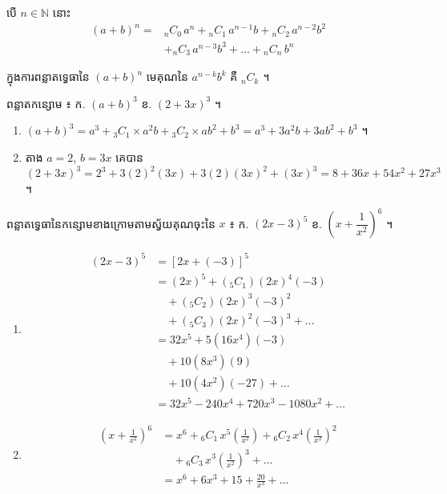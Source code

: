 \begin{theorem}[ទ្រឹស្ដីបទទ្វេធា]
បើ $n \in \mathbb{N}$ នោះ
\[ \begin{aligned} (a + b)^n = {}&{}_nC_0\, a^n + {}_nC_1\, a^{n-1}b + {}_nC_2\, a^{n-2}b^2\\ &+ {}_nC_3\, a^{n-3}b^3 + \dots + {}_nC_n\, b^n \end{aligned} \]
\end{theorem}

\begin{note}[សម្គាល់]
ក្នុងការពន្លាតទ្វេធានៃ $(a + b)^n$ មេគុណនៃ $a^{n-k}b^k$ គឺ ${}_nC_k$ ។
\end{note}

\begin{example}[លំហាត់គំរូ ១]
ពន្លាតកន្សោម ៖ \quad ក. $(a + b)^3$ \quad ខ. $(2 + 3x)^3$ ។
\end{example}
\ans
\begin{enumerate}[a]
  \item $(a + b)^3 = a^3 + {}_3C_1\times a^2b + {}_3C_2\times ab^2 + b^3 = a^3 + 3a^2b + 3ab^2 + b^3$ ។
  \item តាង $a = 2$, $b = 3x$ គេបាន $(2 + 3x)^3 = 2^3 + 3(2)^2(3x) + 3(2)(3x)^2 + (3x)^3 = 8 + 36x + 54x^2 + 27x^3$ ។
\end{enumerate}

\begin{example}[លំហាត់គំរូ ២]
ពន្លាតទ្វេធានៃកន្សោមខាងក្រោមតាមស្វ័យគុណចុះនៃ $x$ ៖ \quad ក. $(2x - 3)^5$ \quad ខ. $\left(x + \dfrac{1}{x^2}\right)^6$ ។
\end{example}
\ans
\begin{enumerate}[a]
  \item \[ \begin{aligned}
(2x - 3)^5 &= [2x + (-3)]^5\\
&= (2x)^5 + ({}_5C_1)(2x)^4(-3)\\
&\quad + ({}_5C_2)(2x)^3(-3)^2\\
&\quad + ({}_5C_3)(2x)^2(-3)^3 + \dots\\
&= 32x^5 + 5(16x^4)(-3)\\
&\quad + 10(8x^3)(9)\\
&\quad + 10(4x^2)(-27) + \dots\\
&= 32x^5 - 240x^4 + 720x^3 - 1080x^2 + \dots
\end{aligned} \]
  \item \[ \begin{aligned} \left(x + \frac{1}{x^2}\right)^6 &= x^6 + {}_6C_1\, x^5\left(\frac{1}{x^2}\right) + {}_6C_2\, x^4\left(\frac{1}{x^2}\right)^2\\ &\quad + {}_6C_3\, x^3\left(\frac{1}{x^2}\right)^3 + \dots\\ &= x^6 + 6x^3 + 15 + \frac{20}{x^3} + \dots \end{aligned} \]
\end{enumerate}

